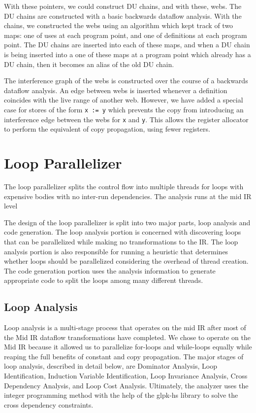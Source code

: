 \documentclass[11pt]{article}
\begin{document}
With these pointers, we could construct DU chains, and with these,
webs.  The DU chains are constructed with a basic backwards dataflow
analysis.  With the chains, we constructed the webs using an algorithm
which kept track of two maps: one of uses at each program point, and
one of definitions at each program point.  The DU chains are inserted
into each of these maps, and when a DU chain is being inserted into a
one of these maps at a program point which already has a DU chain,
then it becomes an alias of the old DU chain.

The interference graph of the webs is constructed over the course of a
backwards dataflow analysis.  An edge between webs is inserted
whenever a definition coincides with the live range of another web.
However, we have added a special case for stores of the form \texttt{x
  := y} which prevents the copy from introducing an interference edge
between the webs for \texttt{x} and \texttt{y}.  This allows the
register allocator to perform the equivalent of copy propagation,
using fewer registers.

\section{Loop Parallelizer}

The loop parallelizer splits the control flow into multiple threads
for loops with expensive bodies with no inter-run dependencies. The
analysis runs at the mid IR level 

The design of the loop parallelizer is split into two major parts,
loop analysis and code generation. The loop analysis portion is
concerned with discovering loops that can be parallelized while making
no transformations to the IR. The loop analysis portion is also
responsible for running a heuristic that determines whether loops
should be parallelized considering the overhead of thread
creation. The code generation portion uses the analysis information to 
generate appropriate code to split the loops among many different
threads.

\subsection { Loop Analysis } 

Loop analysis is a multi-stage process that operates on the mid IR
after most of the Mid IR dataflow transformations have completed. We
chose to operate on the Mid IR because it allowed us to parallelize
for-loops and while-loops equally while reaping the full benefits of
constant and copy propagation. The major stages of loop analysis,
described in detail below, are Dominator Analysis, Loop
Identification, Induction Variable Identification, Loop Invariance
Analysis, Cross Dependency Analysis, and Loop Cost
Analysis. Ultimately, the analyzer uses the integer programming method
with the help of the glpk-hs library to solve the cross dependency
constraints.
\end{document}
